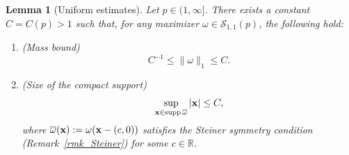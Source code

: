 \documentclass[11pt]{amsart}
\newtheorem{lemma}[theorem]{Lemma}
\theoremstyle{definition}
\theoremstyle{definition}
\numberwithin{equation}{section}
\newcommand{\0}{\emptyset}
\newcommand{\bfx}{{\bf x}}
\newcommand{\calS}{\mathcal S}
\begin{document}
			\begin{lemma}[Uniform estimates]\label{lem_uniform}
				Let $p \in (1, \infty]$.
				There exists a constant $C = C(p)  > 1$ such that, for any maximizer $\omega \in \calS_{1, 1}(p)$, the following hold:
				\begin{enumerate}
					\item (Mass bound)
					\begin{equation}
						\label{eq_uni_mass}
						C^{-1} \le \|\omega\|_1 \le C .
					\end{equation}
					
					\item (Size of the compact support)
					\begin{equation}
						\label{eq_unif_supp}
						\sup_{\bfx \in \operatorname{supp} \overline{\omega}} |\bfx| \le C,
					\end{equation}
					where $\overline{\omega}(\bfx) := \omega(\bfx - (c,0))$ satisfies the Steiner symmetry condition (Remark~\ref{rmk_Steiner}) for some $c \in \mathbb{R}$.
				\end{enumerate}
			\end{lemma}
			
\end{document}
